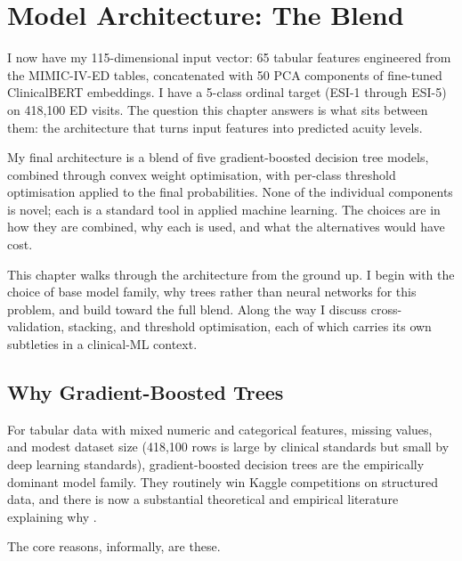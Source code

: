 
\chapter{Model Architecture: The Blend}
\label{ch:architecture}

I now have my 115-dimensional input vector: 65 tabular features engineered from the MIMIC-IV-ED tables, concatenated with 50 PCA components of fine-tuned ClinicalBERT embeddings. I have a 5-class ordinal target (ESI-1 through ESI-5) on 418,100 ED visits. The question this chapter answers is what sits between them: the architecture that turns input features into predicted acuity levels.

My final architecture is a blend of five gradient-boosted decision tree models, combined through convex weight optimisation, with per-class threshold optimisation applied to the final probabilities. None of the individual components is novel; each is a standard tool in applied machine learning. The choices are in how they are combined, why each is used, and what the alternatives would have cost.

This chapter walks through the architecture from the ground up. I begin with the choice of base model family, why trees rather than neural networks for this problem, and build toward the full blend. Along the way I discuss cross-validation, stacking, and threshold optimisation, each of which carries its own subtleties in a clinical-ML context.

\section{Why Gradient-Boosted Trees}

For tabular data with mixed numeric and categorical features, missing values, and modest dataset size (418,100 rows is large by clinical standards but small by deep learning standards), gradient-boosted decision trees are the empirically dominant model family. They routinely win Kaggle competitions on structured data, and there is now a substantial theoretical and empirical literature explaining why \citep{grinsztajn2022trees, shwartz2022tabular}.

The core reasons, informally, are these.

